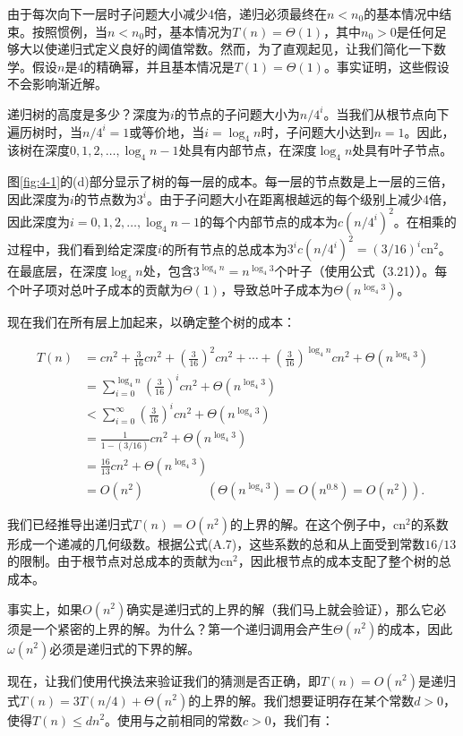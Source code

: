 \documentclass[lang=cn,newtx,10pt,scheme=chinese]{elegantbook}
\begin{document}
由于每次向下一层时子问题大小减少4倍，递归必须最终在$n<n_0$的基本情况中结束。按照惯例，当$n<n_0$时，基本情况为$T(n)=\Theta(1)$，其中$n_0>0$是任何足够大以使递归式定义良好的阈值常数。然而，为了直观起见，让我们简化一下数学。假设$n$是4的精确幂，并且基本情况是$T(1)=\Theta(1)$。事实证明，这些假设不会影响渐近解。

递归树的高度是多少？深度为$i$的节点的子问题大小为$n / 4^i$。当我们从根节点向下遍历树时，当$n / 4^i=1$或等价地，当$i=\log _4 n$时，子问题大小达到$n=1$。因此，该树在深度$0,1,2,\ldots,\log _4 n-1$处具有内部节点，在深度$\log _4 n$处具有叶子节点。

图\ref{fig:4-1}的(d)部分显示了树的每一层的成本。每一层的节点数是上一层的三倍，因此深度为$i$的节点数为$3^i$。由于子问题大小在距离根越远的每个级别上减少4倍，因此深度为$i=0,1,2,\ldots,\log _4 n-1$的每个内部节点的成本为$c(n / 4^i)^2$。在相乘的过程中，我们看到给定深度$i$的所有节点的总成本为$3^ic(n / 4^i)^2=(3 / 16)^i \mathrm{cn}^2$。在最底层，在深度$\log _4 n$处，包含$3^{\log _4 n}=n^{\log _4 3}$个叶子（使用公式（3.21））。每个叶子项对总叶子成本的贡献为$\Theta(1)$，导致总叶子成本为$\Theta(n^{\log _4 3})$。

现在我们在所有层上加起来，以确定整个树的成本：

$$
\begin{aligned}
T(n) & =c n^2+\frac{3}{16} c n^2+(\frac{3}{16})^2 c n^2+\cdots+(\frac{3}{16})^{\log _4 n} c n^2+\Theta(n^{\log _4 3}) \\
& =\sum_{i=0}^{\log _4 n}(\frac{3}{16})^i c n^2+\Theta(n^{\log _4 3}) \\
& <\sum_{i=0}^{\infty}(\frac{3}{16})^i c n^2+\Theta(n^{\log _4 3}) \\
& =\frac{1}{1-(3 / 16)} c n^2+\Theta(n^{\log _4 3}) \\
& =\frac{16}{13} c n^2+\Theta(n^{\log _4 3}) \\
& =O(n^2) \quad\quad\quad\quad\quad(\Theta(n^{\log _4 3})=O(n^{0.8})=O(n^2)) .
\end{aligned}
$$

我们已经推导出递归式$T(n)=O(n^2)$的上界的解。在这个例子中，$\mathrm{cn}^2$的系数形成一个递减的几何级数。根据公式(A.7)，这些系数的总和从上面受到常数$16/13$的限制。由于根节点对总成本的贡献为$\mathrm{cn}^2$，因此根节点的成本支配了整个树的总成本。

事实上，如果$O(n^2)$确实是递归式的上界的解（我们马上就会验证），那么它必须是一个紧密的上界的解。为什么？第一个递归调用会产生$\Theta(n^2)$的成本，因此$\omega(n^2)$必须是递归式的下界的解。

现在，让我们使用代换法来验证我们的猜测是否正确，即$T(n)=O(n^2)$是递归式$T(n)=3 T(n / 4)+\Theta(n^2)$的上界的解。我们想要证明存在某个常数$d>0$，使得$T(n) \leq d n^2$。使用与之前相同的常数$c>0$，我们有：
\end{document}
